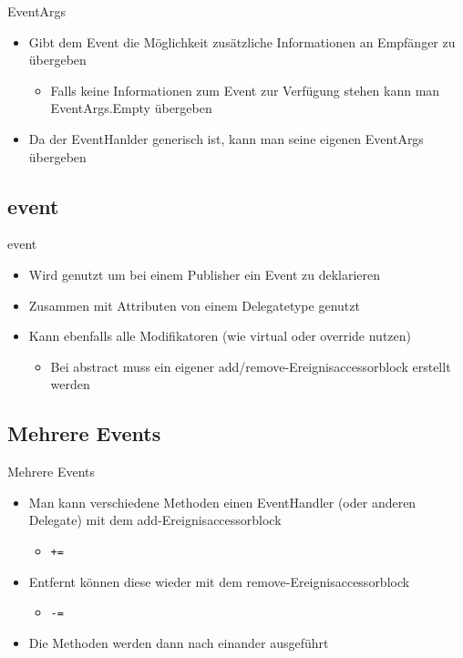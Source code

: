 \begin{frame}{EventArgs}
	\begin{itemize}
		\item Gibt dem Event die Möglichkeit zusätzliche Informationen an Empfänger zu übergeben
		\begin{itemize}
			\item Falls keine Informationen zum Event zur Verfügung stehen kann man \alert{EventArgs.Empty} übergeben
		\end{itemize}
		\item Da der EventHanlder generisch ist, kann man seine eigenen \alert{EventArgs} übergeben
	\end{itemize}
	
\end{frame}

\subsection{event}
\begin{frame}{event}
	\begin{itemize}
		\item Wird genutzt um bei einem Publisher ein Event zu deklarieren
		\item Zusammen mit Attributen von einem Delegatetype genutzt
		\item Kann ebenfalls alle Modifikatoren (wie \alert{virtual} oder \alert{override} nutzen)
		\begin{itemize}
			\item Bei \alert{abstract} muss ein eigener add/remove-Ereignisaccessorblock erstellt werden
		\end{itemize}
	\end{itemize}				
	
\end{frame}

\subsection{Mehrere Events}
\begin{frame}{Mehrere Events}
	\begin{itemize}
		\item Man kann verschiedene Methoden einen EventHandler (oder anderen \alert{Delegate}) mit dem add-Ereignisaccessorblock
			\begin{itemize}
				\item \texttt{\alert{+=}}
			\end{itemize}
		\item Entfernt können diese wieder mit dem remove-Ereignisaccessorblock
			\begin{itemize}
				\item \texttt{\alert{-=}}
			\end{itemize}		
		\item Die Methoden werden dann nach einander ausgeführt
	\end{itemize}
\end{frame}

